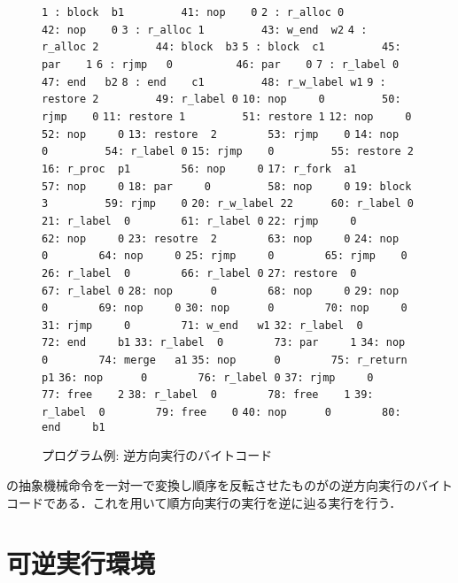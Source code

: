 \documentclass[submit,PRO]{ipsj}
\def\|{\verb|}
\begin{document}
\begin{figure}[tb]
\vbox{
\hbox{\|1 : block  b1         41: nop    0|}
\hbox{\|2 : r_alloc 0         42: nop    0|}
\hbox{\|3 : r_alloc 1         43: w_end  w2|}
\hbox{\|4 : r_alloc 2         44: block  b3|}
\hbox{\|5 : block  c1         45: par    1|}
\hbox{\|6 : rjmp   0          46: par    0|}
\hbox{\|7 : r_label 0          47: end   b2|}
\hbox{\|8 : end    c1         48: r_w_label w1|}
\hbox{\|9 : restore 2         49: r_label 0|}
\hbox{\|10: nop     0         50: rjmp    0|}
\hbox{\|11: restore 1         51: restore 1|}
\hbox{\|12: nop     0         52: nop     0|}
\hbox{\|13: restore  2        53: rjmp    0|}
\hbox{\|14: nop     0         54: r_label 0|}
\hbox{\|15: rjmp    0         55: restore 2|}
\hbox{\|16: r_proc  p1        56: nop     0|}
\hbox{\|17: r_fork  a1        57: nop     0|}
\hbox{\|18: par     0         58: nop     0|}
\hbox{\|19: block   3         59: rjmp    0|}
\hbox{\|20: r_w_label 22      60: r_label 0|}
\hbox{\|21: r_label  0        61: r_label 0|}
\hbox{\|22: rjmp     0        62: nop     0|}
\hbox{\|23: resotre  2        63: nop     0|}
\hbox{\|24: nop      0        64: nop     0|}
\hbox{\|25: rjmp     0        65: rjmp    0|}
\hbox{\|26: r_label  0        66: r_label 0|}
\hbox{\|27: restore  0        67: r_label 0|}
\hbox{\|28: nop      0        68: nop     0|}
\hbox{\|29: nop      0        69: nop     0|}
\hbox{\|30: nop      0        70: nop     0|}
\hbox{\|31: rjmp     0        71: w_end   w1|}
\hbox{\|32: r_label  0        72: end     b1|}
\hbox{\|33: r_label  0        73: par     1|}
\hbox{\|34: nop      0        74: merge   a1|} 
\hbox{\|35: nop      0        75: r_return p1|}
\hbox{\|36: nop      0        76: r_label 0|}
\hbox{\|37: rjmp     0        77: free    2|}
\hbox{\|38: r_label  0        78: free    1|}
\hbox{\|39: r_label  0        79: free    0|}
\hbox{\|40: nop      0        80: end     b1|}
}
\centerline{}
\caption{プログラム例: 逆方向実行のバイトコード}
\label{fig:backward}
\end{figure}

の抽象機械命令を一対一で変換し順序を反転させたものがの逆方向実行のバイトコードである．これを用いて順方向実行の実行を逆に辿る実行を行う．

\section{可逆実行環境}
\label{config}
\end{document}
